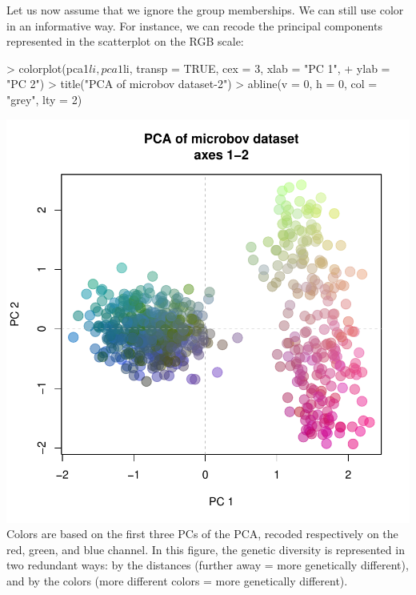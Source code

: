 \documentclass{article}
\begin{document}
Let us now assume that we ignore the group memberships.
We can still use color in an informative way.
For instance, we can recode the principal components represented in the scatterplot on the RGB
scale:
\begin{Schunk}
\begin{Sinput}
> colorplot(pca1$li, pca1$li, transp = TRUE, cex = 3, xlab = "PC 1", 
+     ylab = "PC 2")
> title("PCA of microbov dataset-2")
> abline(v = 0, h = 0, col = "grey", lty = 2)
\end{Sinput}
\end{Schunk}
\includegraphics{figs/base-074}
Colors are based on the first three PCs of the PCA, recoded respectively on the red, green, and blue channel.
In this figure, the genetic diversity is represented in two redundant ways: by the distances
(further away = more genetically different), and by the colors (more different colors = more
genetically different).
\end{document}
